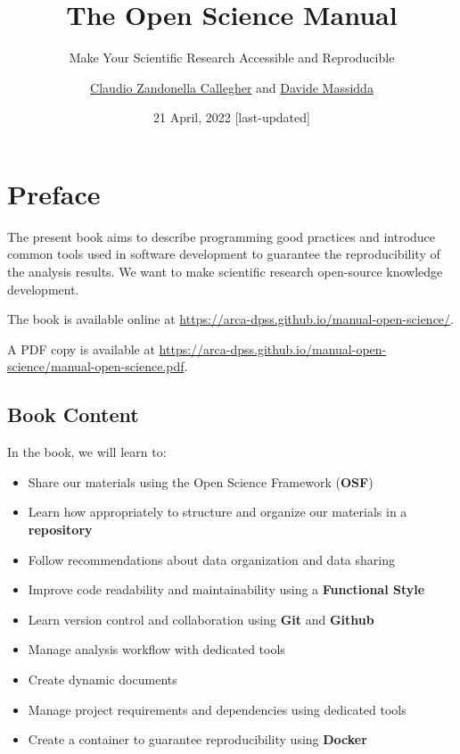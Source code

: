 \documentclass[
  11pt,
]{book}
\title{The Open Science Manual}
\subtitle{Make Your Scientific Research Accessible and Reproducible}
\author{\href{https://claudiozandonella.netlify.app/}{Claudio Zandonella Callegher} and
\href{https://www.linkedin.com/in/davidemassidda/}{Davide Massidda}}
\date{21 April, 2022 {[}last-updated{]}}
\providecommand{\tightlist}{%
  \setlength{\itemsep}{0pt}\setlength{\parskip}{0pt}}
\begin{document}
\maketitle

\pagestyle{empty}
\clearpage
\frontmatter
\pagestyle{plain}

{
\setcounter{tocdepth}{3}
\tableofcontents
}
\mainmatter
\pagestyle{myfancy}

\hypertarget{preface}{%
\chapter*{Preface}\label{preface}}

The present book aims to describe programming good practices and introduce common tools used in software development to guarantee the reproducibility of the analysis results. We want to make scientific research open-source knowledge development.

The book is available online at \url{https://arca-dpss.github.io/manual-open-science/}.

A PDF copy is available at \url{https://arca-dpss.github.io/manual-open-science/manual-open-science.pdf}.

\hypertarget{book-content}{%
\section*{Book Content}\label{book-content}}

In the book, we will learn to:

\begin{itemize}
\tightlist
\item
  Share our materials using the Open Science Framework (\textbf{OSF})
\item
  Learn how appropriately to structure and organize our materials in a \textbf{repository}
\item
  Follow recommendations about data organization and data sharing
\item
  Improve code readability and maintainability using a \textbf{Functional Style}
\item
  Learn version control and collaboration using \textbf{Git} and \textbf{Github}
\item
  Manage analysis workflow with dedicated tools
\item
  Create dynamic documents
\item
  Manage project requirements and dependencies using dedicated tools
\item
  Create a container to guarantee reproducibility using \textbf{Docker}
\end{itemize}
\end{document}
